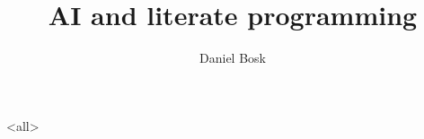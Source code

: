 \documentclass[9pt,ignoreframetext]{beamer}
\begin{document}
\title{%
  AI and literate programming
}
\author{Daniel Bosk}

\begin{frame}
  \maketitle
\end{frame}

\mode<all>

\mode*
%
\end{document}
